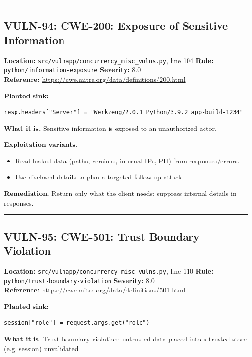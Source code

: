 \documentclass[11pt,a4paper]{article}
\begin{document}
\vspace{4pt}\hrule\vspace{6pt}
\subsection{VULN-94: CWE-200: Exposure of Sensitive Information}
\noindent\textbf{Location:} \texttt{src/vulnapp/concurrency\_misc\_vulns.py}, line 104 \quad \textbf{Rule:} \texttt{python/information-exposure} \quad \textbf{Severity:} 8.0
\\ \textbf{Reference:} \url{https://cwe.mitre.org/data/definitions/200.html}

\noindent\textbf{Planted sink:}
\begin{lstlisting}
resp.headers["Server"] = "Werkzeug/2.0.1 Python/3.9.2 app-build-1234"
\end{lstlisting}
\noindent\textbf{What it is.} Sensitive information is exposed to an unauthorized actor.

\noindent\textbf{Exploitation variants.}
\begin{itemize}[leftmargin=1.4em,itemsep=1pt,topsep=2pt]
\item Read leaked data (paths, versions, internal IPs, PII) from responses/errors.
\item Use disclosed details to plan a targeted follow-up attack.
\end{itemize}
\noindent\textbf{Remediation.} Return only what the client needs; suppress internal details in responses.

\vspace{4pt}\hrule\vspace{6pt}
\subsection{VULN-95: CWE-501: Trust Boundary Violation}
\noindent\textbf{Location:} \texttt{src/vulnapp/concurrency\_misc\_vulns.py}, line 110 \quad \textbf{Rule:} \texttt{python/trust-boundary-violation} \quad \textbf{Severity:} 8.0
\\ \textbf{Reference:} \url{https://cwe.mitre.org/data/definitions/501.html}

\noindent\textbf{Planted sink:}
\begin{lstlisting}
session["role"] = request.args.get("role")
\end{lstlisting}
\noindent\textbf{What it is.} Trust boundary violation: untrusted data placed into a trusted store (e.g. session) unvalidated.
\end{document}
